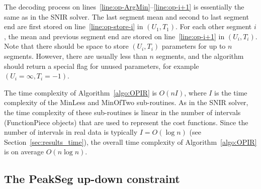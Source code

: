 \documentclass{article}
\begin{document}
The decoding process on lines~\ref{line:op-ArgMin}--\ref{line:op-i+1}
is essentially the same as in the SNIR solver. The last segment mean
and second to last segment end are first stored on
line~\ref{line:op-store-i} in $(U_1,T_1)$. For each other segment $i$,
the mean and previous segment end are stored on line~\ref{line:op-i+1}
in $(U_i,T_i)$. Note that there should be space to store $(U_i,T_i)$
parameters for up to $n$ segments. However, there are usually less
than $n$ segments, and the algorithm should return a special flag for
unused parameters, for example $(U_i=\infty, T_i=-1)$.

The time complexity of Algorithm~\ref{algo:OPIR} is $O(n I)$, where
$I$ is the time complexity of the MinLess and MinOfTwo
sub-routines. As in the SNIR solver, the time complexity of these
sub-routines is linear in the number of intervals (FunctionPiece
objects) that are used to represent the cost functions. Since the
number of intervals in real data is typically $I=O(\log n)$ (see
Section~\ref{sec:results_time}), the overall time complexity of
Algorithm~\ref{algo:OPIR} is on average $O(n \log n)$.

\subsection{The PeakSeg up-down constraint}
\label{sec:PeakSeg}
\end{document}
